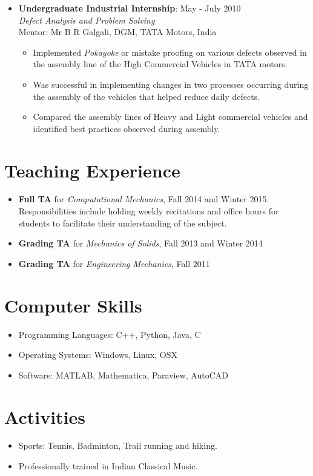\documentclass[10pt,fleqn]{article}
\begin{document}
\begin{itemize}
\item[] \textbf{Undergraduate Industrial Internship}: \hfill May - July 2010\\
		\emph{Defect Analysis and Problem Solving}\\
		 Mentor: Mr B R Galgali, DGM, TATA Motors, India
		    \begin{itemize}
			\item Implemented \emph{Pokayoke} or mistake proofing on various defects observed in the assembly line of the High Commercial Vehicles in TATA motors.
			\item Was successful in implementing changes in two processes occurring during the assembly of the vehicles that helped reduce daily defects.
			\item Compared the assembly lines of Heavy and Light commercial vehicles and identified best practices observed during assembly.  
 			\end{itemize} 			
\end{itemize}

\section*{Teaching Experience}
\begin{itemize}
\item \textbf{Full TA} for \emph{Computational Mechanics}, Fall 2014 and Winter 2015.\\
Responsibilities include holding weekly recitations and office hours for students to facilitate their understanding of the subject.
\item \textbf{Grading TA} for \emph{Mechanics of Solids}, Fall 2013 and Winter 2014
\item \textbf{Grading TA} for \emph{Engineering Mechanics}, Fall 2011
\end{itemize}
\section*{Computer Skills}
\begin{itemize}
\setlength{\itemsep}{0pt}
\item Programming Languages: C++, Python, Java, C
\item Operating Systems: Windows, Linux, OSX
\item Software: MATLAB, Mathematica, Paraview, AutoCAD
\end{itemize}

\section*{Activities}
\begin{itemize}
\setlength{\itemsep}{0pt}
\item Sports: Tennis, Badminton, Trail running and hiking.
\item Professionally trained in Indian Classical Music.
\end{itemize}
\end{document}
